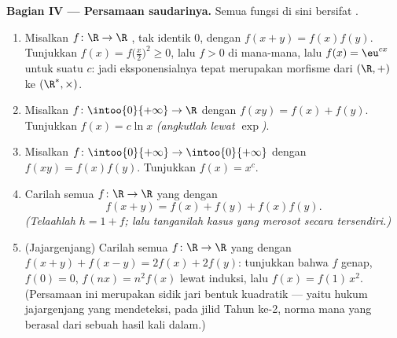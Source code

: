 \begin{problem}[{Soal akhir pekan --- $f(x + y) = f(x) + f(y)$:
keteraturan memaksa kelinearan, beserta potret monsternya}]
\medskip
\noindent\textbf{Bagian IV --- Persamaan saudarinya.} Semua
fungsi di sini bersifat .
\begin{enumerate}[resume]
  \item Misalkan $f \colon \R \to \R$ , tak identik
        $0$, dengan $f(x + y) = f(x)f(y)$. Tunjukkan $f(x) =
        f\bigl(\frac x2\bigr)^2 \geq 0$, lalu $f > 0$ di mana-mana,
        lalu $f(x) = \eu^{cx}$ untuk suatu $c$: jadi eksponensialnya
        tepat merupakan morfisme  dari $(\R, +)$ ke
        $(\R^*, \times)$.
  \item Misalkan $f \colon \intoo{0}{+\infty} \to \R$ 
        dengan $f(xy) = f(x) + f(y)$. Tunjukkan $f(x) = c\ln x$
        \emph{(angkutlah lewat $\exp$)}.
  \item Misalkan $f \colon \intoo{0}{+\infty} \to \intoo{0}{+\infty}$
         dengan $f(xy) = f(x)f(y)$. Tunjukkan $f(x) = x^c$.
  \item Carilah semua $f \colon \R \to \R$ yang  dengan
        \[
        f(x + y) = f(x) + f(y) + f(x)f(y) .
        \]
        \emph{(Telaahlah $h = 1 + f$; lalu tanganilah kasus yang merosot
        secara tersendiri.)}
  \item (Jajargenjang) Carilah semua $f \colon \R \to \R$ yang 
        dengan $f(x + y) + f(x - y) = 2f(x) + 2f(y)$: tunjukkan bahwa $f$
        genap, $f(0) = 0$, $f(nx) = n^2 f(x)$ lewat induksi, lalu
        $f(x) = f(1)\,x^2$. (Persamaan ini merupakan sidik jari
        bentuk kuadratik --- yaitu hukum jajargenjang yang mendeteksi,
        pada jilid Tahun ke-2, norma mana yang berasal dari sebuah hasil
        kali dalam.)
\end{enumerate}


\end{problem}
